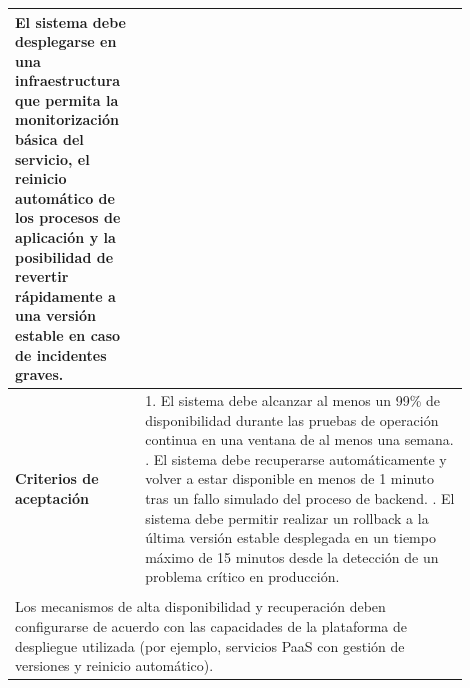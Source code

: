 \begin{longtable}{|p{0.25\linewidth}|p{0.15\linewidth}|p{0.15\linewidth}|p{0.35\linewidth}|}
{		El sistema debe desplegarse en una infraestructura que permita la monitorización básica del servicio, el reinicio automático de los procesos de aplicación y la posibilidad de revertir rápidamente a una versión estable en caso de incidentes graves.} \\ \hline
		\cellcolor{tableheaderblue}\textbf{Criterios de aceptación} & \multicolumn{3}{p{0.70\linewidth}|}{                                                                                                                                                       %
			1. El sistema debe alcanzar al menos un 99\% de disponibilidad durante las pruebas de operación continua en una ventana de al menos una semana. \newline
			2. El sistema debe recuperarse automáticamente y volver a estar disponible en menos de 1 minuto tras un fallo simulado del proceso de backend. \newline
		3. El sistema debe permitir realizar un rollback a la última versión estable desplegada en un tiempo máximo de 15 minutos desde la detección de un problema crítico en producción.}                                                                      \\ \hline
		\rowcolor{tableheaderblue}
		\multicolumn{4}{|l|}{\textbf{Restricciones}}                                                                                                                                                                                                             \\ \hline
		\multicolumn{4}{|p{0.96\linewidth}|}{%
		Los mecanismos de alta disponibilidad y recuperación deben configurarse de acuerdo con las capacidades de la plataforma de despliegue utilizada (por ejemplo, servicios PaaS con gestión de versiones y reinicio automático).}                           \\ \hline
	
\end{longtable}
\endgroup



